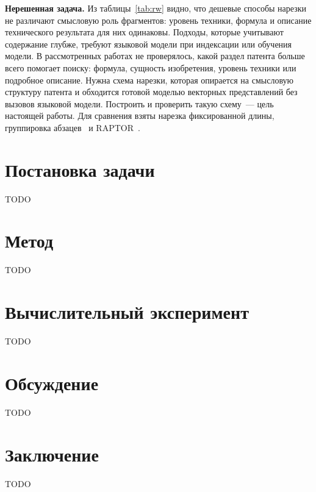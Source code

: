 \documentclass{article}
\begin{document}
\textbf{Нерешенная задача.}
Из таблицы~\ref{tab:rw} видно, что дешевые способы нарезки не различают смысловую роль фрагментов: уровень техники, формула и описание технического результата для них одинаковы. Подходы, которые учитывают содержание глубже, требуют языковой модели при индексации или обучения модели. В рассмотренных работах не проверялось, какой раздел патента больше всего помогает поиску: формула, сущность изобретения, уровень техники или подробное описание. Нужна схема нарезки, которая опирается на смысловую структуру патента и обходится готовой моделью векторных представлений без вызовов языковой модели. Построить и проверить такую схему~--- цель настоящей работы. Для сравнения взяты нарезка фиксированной длины, группировка абзацев~\citep{shaukat2026chunking} и RAPTOR~\citep{sarthi2024raptor}.

\section{Постановка задачи}\label{sec:prelim}

TODO

\section{Метод}\label{sec:method}

TODO

\section{Вычислительный эксперимент}\label{sec:exp}

TODO

\section{Обсуждение}\label{sec:disc}

TODO

\section{Заключение}\label{sec:concl}

TODO




\end{document}
